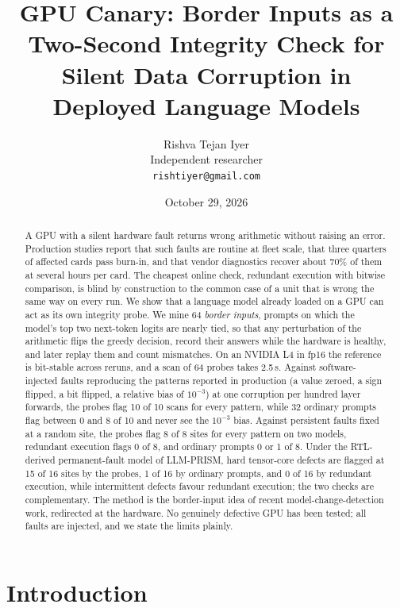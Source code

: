 \documentclass[11pt]{article}
\title{\textbf{GPU Canary: Border Inputs as a Two-Second Integrity Check for Silent Data Corruption in Deployed Language Models}}
\author{Rishva Tejan Iyer\\\small Independent researcher\\\small \texttt{rishtiyer@gmail.com}}
\date{October 29, 2026}
\begin{document}
\maketitle

\begin{abstract}
A GPU with a silent hardware fault returns wrong arithmetic without raising an error. Production studies report that such faults are routine at fleet scale, that three quarters of affected cards pass burn-in, and that vendor diagnostics recover about 70\% of them at several hours per card. The cheapest online check, redundant execution with bitwise comparison, is blind by construction to the common case of a unit that is wrong the same way on every run. We show that a language model already loaded on a GPU can act as its own integrity probe. We mine 64 \emph{border inputs}, prompts on which the model's top two next-token logits are nearly tied, so that any perturbation of the arithmetic flips the greedy decision, record their answers while the hardware is healthy, and later replay them and count mismatches. On an NVIDIA L4 in fp16 the reference is bit-stable across reruns, and a scan of 64 probes takes 2.5\,s. Against software-injected faults reproducing the patterns reported in production (a value zeroed, a sign flipped, a bit flipped, a relative bias of $10^{-3}$) at one corruption per hundred layer forwards, the probes flag 10 of 10 scans for every pattern, while 32 ordinary prompts flag between 0 and 8 of 10 and never see the $10^{-3}$ bias. Against persistent faults fixed at a random site, the probes flag 8 of 8 sites for every pattern on two models, redundant execution flags 0 of 8, and ordinary prompts 0 or 1 of 8. Under the RTL-derived permanent-fault model of LLM-PRISM, hard tensor-core defects are flagged at 15 of 16 sites by the probes, 1 of 16 by ordinary prompts, and 0 of 16 by redundant execution, while intermittent defects favour redundant execution; the two checks are complementary. The method is the border-input idea of recent model-change-detection work, redirected at the hardware. No genuinely defective GPU has been tested; all faults are injected, and we state the limits plainly.
\end{abstract}

\section{Introduction}
\end{document}
